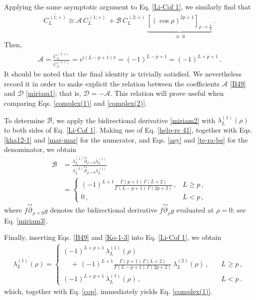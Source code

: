 \documentclass[aps,twocolumn,nofootinbib]{revtex4}
\begin{document}
{\begin{appendix}
Applying the same asymptotic argument to Eq. \eqref{Li-Cof 1}, we similarly find that
\begin{align}
    \overline{C_L^{\,(1;+)}} \cong \mathcal{A}\, C_L^{\,(1;+)}\,+ \mathcal{B}\,C_L^{\,(2;+)}\,\underbrace{\left[(\cos\rho)^{2p+1}\right]_{\rho\longrightarrow\tfrac{\pi}{2}}}_{\cong\; 0} \,.
\end{align}
Then,
\begin{align}\label{B49}
    \mathcal{A} = \frac{\overline{C_L^{\,(1;+)}}}{C_L^{\,(1;+)}} = e^{\mathrm{i}(L-p+1)\pi} = (-1)^{L-p+1}=(-1)^{L+p+1}\,.
\end{align}
It should be noted that the final identity is trivially satisfied. We nevertheless record it in order to make explicit the relation between the coefficients $\mathcal{A}$ \eqref{B49} and $\mathcal{D}$ \eqref{miriam1}; that is, $\mathcal{D} = - \mathcal{A}$. This relation will prove useful when comparing Eqs. \eqref{complex(1)} and \eqref{complex(2)}.

To determine $\mathcal{B}$, we apply the bidirectional derivative \eqref{miriam2} with $\lambda^{(1)}_L(\rho)$ to both sides of Eq. \eqref{Li-Cof 1}. Making use of Eq. \eqref{help-re 41}, together with Eqs. \eqref{kha12-1} and \eqref{mar-mar} for the numerator, and Eqs. \eqref{asy} and \eqref{te-ra-be} for the denominator, we obtain
\begin{align}\label{Ko-1-3}
    \mathcal{B} &= \frac{\overline{\lambda^{(1)}_L}\stackrel{\leftrightarrow}{\partial}_{\rho=0}\lambda^{(1)}_L}{\lambda^{(2)}_L\stackrel{\leftrightarrow}{\partial}_{\rho=0}\lambda^{(1)}_L} \nonumber\\[3pt]
    &=
    \begin{cases}
        (-1)^{L+1} \frac{\Gamma(p+1) \,\Gamma(L+2)}{\Gamma(L-p+1) \,\Gamma(2p+2)} \,, & L\geqslant p\,, \\[7pt] 
        0 \,, & L<p \,,       
    \end{cases}
\end{align}
where $f\stackrel{\leftrightarrow}{\partial}_{\rho=0}g$ denotes the bidirectional derivative $f\stackrel{\leftrightarrow}{\partial}_{\rho}g$ evaluated at $\rho=0$; see Eq. \eqref{miriam3}.

Finally, inserting Eqs. \eqref{B49} and \eqref{Ko-1-3} into Eq. \eqref{Li-Cof 1}, we obtain
\begin{align}\label{miriamNB}
    \overline{\lambda_L^{(1)}(\rho)} \!= \!\!
    \begin{cases}
        (-1)^{L+p+1}\,\lambda_L^{(1)}(\rho) \\[8pt] 
        \;\;\;\; +\, (-1)^{L+1} \frac{\Gamma(p+1) \,\Gamma(L+2)}{\Gamma(L-p+1) \,\Gamma(2p+2)} \,\lambda_L^{(2)}(\rho)\,, \quad & L \geqslant p \,,\\[14pt]
        (-1)^{L+p+1}\, \lambda_L^{(1)}(\rho)\,, \quad &L < p \,.
    \end{cases}
\end{align}
which, together with Eq. \eqref{cop}, immediately yields Eq. \eqref{complex(1)}.



\end{appendix}}
\end{document}
